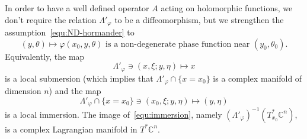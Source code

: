 \documentclass{article}
\newcommand{\phy}{\varphi}
\newcommand{\CM}{\mathbb{C}}
\begin{document}
In order to have a well defined operator $A$ acting on holomorphic
functions, we don't require the relation $\Lambda'_\phy$ to be a
diffeomorphism, but we strengthen the
assumption~\eqref{equ:ND-hormander} to
\begin{equation}
  \label{equ:ND-strong}
  (y,\theta)\mapsto \phy(x_0,y,\theta) \text{ is a non-degenerate phase function near } (y_0,\theta_0).
\end{equation}
Equivalently, the map
\[
\Lambda'_\phy \ni (x,\xi;y,\eta) \mapsto x
\]
is a local submersion (which implies that $\Lambda'_\phy\cap\{x=x_0\}$
is a complex manifold of dimension $n$) and the map
\begin{equation}
  \label{equ:immersion}
  \Lambda'_\phy\cap \{x=x_0\} \ni (x_0,\xi;y,\eta) \mapsto (y,\eta)
\end{equation}
is a local immersion. The image of~\eqref{equ:immersion}, namely
$(\Lambda'_\phy)^{-1}(T^*_{x_0}\CM^n)$, is a complex Lagrangian
manifold in $T^*\CM^n$.
\end{document}
